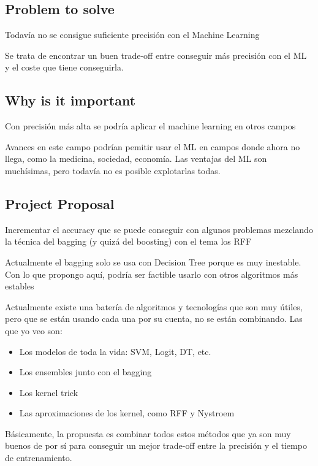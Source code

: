 \subsection{Problem to solve}

  Todavía no se consigue suficiente precisión con el Machine Learning

  \begin{note}
    Se trata de encontrar un buen trade-off entre conseguir más precisión con el
    ML y el coste que tiene conseguirla.
  \end{note}

\subsection{Why is it important}
  Con precisión más alta se podría aplicar el machine learning en otros campos

  \begin{note}
    Avances en este campo podrían pemitir usar el ML en campos donde ahora no
    llega, como la medicina, sociedad, economía. Las ventajas del ML son
    muchísimas, pero todavía no es posible explotarlas todas.
  \end{note}

\subsection{Project Proposal}
  Incrementar el accuracy que se puede conseguir con algunos problemas mezclando
  la técnica del bagging (y quizá del boosting) con el tema los RFF

  Actualmente el bagging solo se usa con Decision Tree porque es muy inestable.
  Con lo que propongo aquí, podría ser factible usarlo con otros algoritmos más
  estables

  \begin{note}
    Actualmente existe una batería de algoritmos y tecnologías que son muy
    útiles, pero que se están usando cada una por su cuenta, no se están
    combinando. Las que yo veo son:
    \begin{itemize}
      \item Los modelos de toda la vida: SVM, Logit, DT, etc.
      \item Los ensembles junto con el bagging
      \item Los kernel trick
      \item Las aproximaciones de los kernel, como RFF y Nystroem
    \end{itemize}

    Básicamente, la propuesta es combinar todos estos métodos que ya son muy
    buenos de por sí para conseguir un mejor trade-off entre la precisión y el
    tiempo de entrenamiento.
  \end{note}


